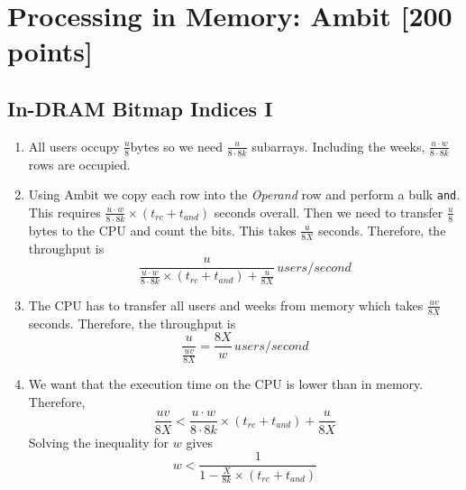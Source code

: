 \documentclass[a4paper]{article}
\begin{document}
\section{Processing in Memory: Ambit [200 points]}

\subsection{In-DRAM Bitmap Indices I}

\begin{enumerate}[label=\alph*)]
    \item All users occupy $\frac{u}{8}$bytes so we need $\frac{u}{8\cdot8k}$ subarrays. Including the
        weeks, $\frac{u \cdot w}{8\cdot8k}$ rows are occupied.
    \item Using Ambit we copy each row into the \textit{Operand} row and perform a bulk \verb|and|. This 
        requires $\frac{u \cdot w}{8\cdot8k} \times (t_{rc} + t_{and})$ seconds overall. Then we need 
        to transfer $\frac{u}{8}$bytes to the CPU and count the bits. This takes $\frac{u}{8X}$ seconds.
        Therefore, the throughput is
        \begin{equation*}
            \frac{u}{
                \frac{u \cdot w}{8\cdot8k} \times (t_{rc} + t_{and}) +
                \frac{u}{8X}
            } \, users/second
        \end{equation*}

    \item The CPU has to transfer all users and weeks from memory which takes $\frac{uv}{8X}$
        seconds. Therefore, the throughput is
        \begin{equation*}
            \frac{u}{\frac{uv}{8X}} = \frac{8X}{w} \, users/second
        \end{equation*}

    \item We want that the execution time on the CPU is lower than in memory. Therefore,
        \begin{equation*}
        \frac{uv}{8X} < \frac{u \cdot w}{8\cdot8k} \times (t_{rc} + t_{and}) +
                \frac{u}{8X}
        \end{equation*}
        Solving the inequality for $w$ gives
        \begin{equation*}
            w < \frac{1}{1 - \frac{X}{8k} \times (t_{rc} + t_{and})}
        \end{equation*}
\end{enumerate}
\end{document}
